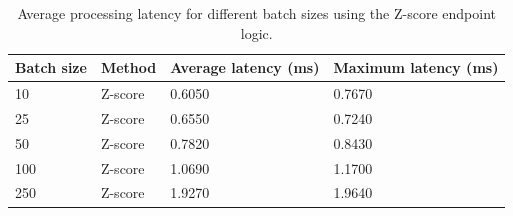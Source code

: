 \begin{table}[H]
\centering
\caption{Average processing latency for different batch sizes using the Z-score endpoint logic.}
\label{tab:performance_latency}
\begin{tabular}{llll}
\hline
Batch size & Method & Average latency (ms) & Maximum latency (ms) \\
\hline
10 & Z-score & 0.6050 & 0.7670 \\
25 & Z-score & 0.6550 & 0.7240 \\
50 & Z-score & 0.7820 & 0.8430 \\
100 & Z-score & 1.0690 & 1.1700 \\
250 & Z-score & 1.9270 & 1.9640 \\
\hline
\end{tabular}
\end{table}
